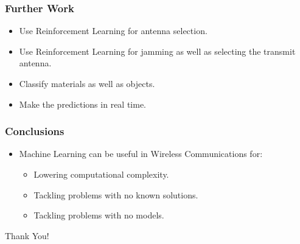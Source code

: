\documentclass{beamer}
\begin{document}
\begin{frame}
    \frametitle{Further Work}
    
    \begin{itemize}
        \item Use Reinforcement Learning for antenna selection.
        \item Use Reinforcement Learning for jamming as well as selecting the transmit antenna.
        \item Classify materials as well as objects.
        \item Make the predictions in real time. 
    \end{itemize}
\end{frame}

\begin{frame}
    \frametitle{Conclusions}
    
    \begin{itemize}
    \item Machine Learning can be useful in Wireless Communications for:
	    \begin{itemize}
	    \item Lowering computational complexity.
	    \item Tackling problems with no known solutions.
	    \item Tackling problems with no models.
	    \end{itemize}
    \end{itemize}
\end{frame}


\begin{frame}
\centering
\Huge{\color[RGB]{204,0,0}Thank You!}
\end{frame}
\end{document}

